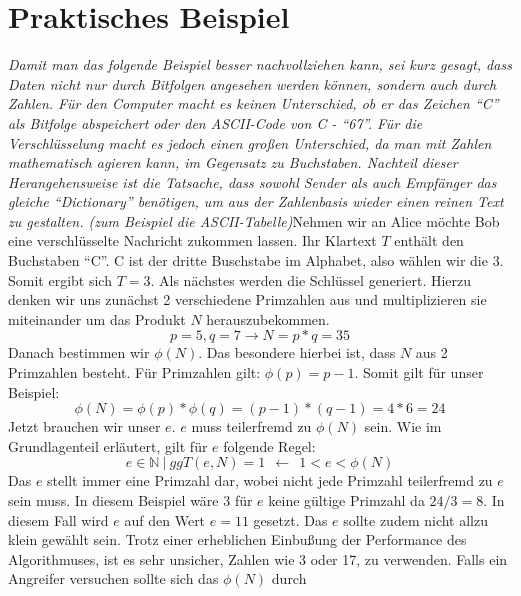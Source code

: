 \section{Praktisches Beispiel}
\emph{Damit man das folgende Beispiel besser nachvollziehen kann, sei kurz
gesagt, dass Daten nicht nur durch Bitfolgen angesehen werden können, sondern
auch durch Zahlen. Für den Computer macht es keinen Unterschied, ob er das Zeichen "`C"'
als Bitfolge abspeichert oder den ASCII-Code von C - "`67"'. Für die
Verschlüsselung macht es jedoch einen großen Unterschied, da man mit Zahlen
mathematisch agieren kann, im Gegensatz zu Buchstaben. Nachteil dieser
Herangehensweise ist die Tatsache, dass sowohl Sender als auch Empfänger
das gleiche "`Dictionary"' benötigen, um aus der Zahlenbasis wieder einen reinen
Text zu gestalten. (zum Beispiel die
ASCII-Tabelle)}\newline\newline Nehmen wir an Alice möchte Bob eine
verschlüsselte Nachricht zukommen lassen.
Ihr Klartext $T$ enthält den Buchstaben "`C"'. C ist der dritte Buschstabe im
Alphabet, also wählen wir die 3. Somit ergibt sich $T = 3$.
Als nächstes werden die Schlüssel generiert. Hierzu denken wir uns zunächst 2
verschiedene Primzahlen aus und multiplizieren sie miteinander um das
Produkt $N$ herauszubekommen.
\begin{displaymath}
p = 5, q = 7 \rightarrow N = p * q = 35
\end{displaymath}
Danach bestimmen wir $\phi(N)$. Das besondere hierbei ist, dass $N$ aus
2 Primzahlen besteht. Für Primzahlen gilt: $ \phi(p) = p-1$. Somit gilt für
unser Beispiel:
\begin{displaymath}
\phi(N) = \phi(p) * \phi(q) = (p-1)*(q-1) = 4*6 = 24 
\end{displaymath}
Jetzt brauchen wir unser $e$. $e$ muss teilerfremd zu $\phi(N)$ sein. Wie im
Grundlagenteil erläutert, gilt für $e$ folgende Regel: 
\begin{displaymath}
e \in \mathbb{N} \ | \ ggT(e,N) = 1 \ \ \gets \  \ 1<e<\phi(N)
\end{displaymath}
Das $e$ stellt immer eine Primzahl dar, wobei nicht jede Primzahl teilerfremd
zu $e$ sein muss. In diesem Beispiel wäre 3 für $e$ keine gültige Primzahl da
$24/3 = 8$. In diesem Fall wird $e$ auf den Wert $e = 11$ gesetzt. Das
$e$ sollte zudem nicht allzu klein gewählt sein. Trotz einer erheblichen
Einbußung der Performance des Algorithmuses, ist es sehr unsicher, Zahlen wie 3
oder 17, zu verwenden. Falls ein Angreifer versuchen sollte sich das $\phi(N)$ durch
